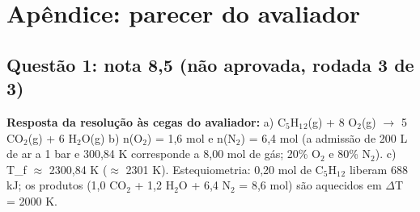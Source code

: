 \documentclass{article}%
\begin{document}
\section*{Apêndice: parecer do avaliador}%
\subsection*{Questão 1: nota 8,5 (não aprovada, rodada 3 de 3)}%
\textbf{Resposta da resolução às cegas do avaliador:} a) C$_{5}$H$_{1}$$_{2}$(g) + 8 O$_{2}$(g) $\to$ 5 CO$_{2}$(g) + 6 H$_{2}$O(g)\newline%
\newline%
b) n(O$_{2}$) = 1,6 mol e n(N$_{2}$) = 6,4 mol (a admissão de 200 L de ar a 1 bar e 300,84 K corresponde a 8,00 mol de gás; 20\% O$_{2}$ e 80\% N$_{2}$).\newline%
\newline%
c) T\_f $\approx$ 2300,84 K ($\approx$ 2301 K). Estequiometria: 0,20 mol de C$_{5}$H$_{1}$$_{2}$ liberam 688 kJ; os produtos (1,0 CO$_{2}$ + 1,2 H$_{2}$O + 6,4 N$_{2}$ = 8,6 mol) são aquecidos em $\Delta$T = 2000 K.\newline%
\newline%
\end{document}
